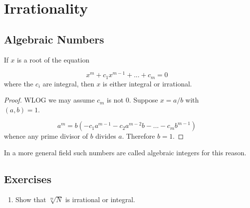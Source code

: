 \section{Irrationality}

\subsection{Algebraic Numbers}
\begin{theorem}
    If $x$ is a root of the equation

    \begin{equation*}
        x^m + c_1x^{m-1} + ... + c_m = 0
    \end{equation*}
    \noi
    where the $c_i$ are integral, then $x$ is either integral or irrational.
\end{theorem}

\begin{proof}
    WLOG we may assume $c_m$ is not 0. Suppose $x = a/b$ with \\ $(a,b) = 1$.

    \begin{equation*}
        a^m = b(-c_1 a^{m-1} - c_2 a^{m-2}b - ... - c_m b^{m-1})
    \end{equation*}
    whence any prime divisor of $b$ divides $a$. Therefore $b=1$.
\end{proof}

\begin{remark}
    In a more general field such numbers are called algebraic integers for this reason.
\end{remark}

\subsection{Exercises}
\begin{enumerate}
    \item Show that $\sqrt[m]{N}$ is irrational or integral. 
\end{enumerate}


